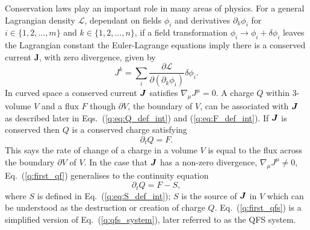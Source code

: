 Conservation laws play an important role in many areas of physics. For a general Lagrangian density $\mathcal{L}$, dependant on fields $\phi_i$ and derivatives $\partial_k \phi_i$ for $i \in \{1,2,...,m \}$ and $k \in \{1,2,...,n \}$, if a field transformation $\phi_i \rightarrow \phi_i + \delta \phi_i$ leaves the Lagrangian constant the Euler-Lagrange equations imply there is a conserved current $\boldsymbol{J}$, with zero divergence, given by
\begin{equation}
J^k = \sum_i \frac{\partial \mathcal{L}}{\partial (\partial_k \phi_i)}\delta \phi_i.
\end{equation}
In curved space a conserved current $\boldsymbol{J}$ satisfies $\nabla_\mu J^\mu = 0$. A charge $Q$ within 3-volume $V$ and a flux $F$ though $\partial V$, the boundary of $V$, can be associated with $\boldsymbol{J}$ as described later in Eqs.~(\ref{q:eq:Q_def_int}) and (\ref{q:eq:F_def_int}). If $\boldsymbol{J}$ is conserved then $Q$ is a conserved charge satisfying
\begin{equation}
\label{q:first_qf}\partial_t Q = {F}.
\end{equation}
This says the rate of change of a charge in a volume $V$ is equal to the flux across the boundary $\partial V$ of $V$. In the case that $\boldsymbol{J}$ has a non-zero divergence, $\nabla_\mu J^\mu \neq 0$, Eq.~(\ref{q:first_qf}) generalises to the continuity equation
\begin{equation}
\label{q:first_qfs}\partial_t {Q} = {F} - {S},
\end{equation}
where $S$ is defined in Eq.~(\ref{q:eq:S_def_int}); ${S}$ is the source of $\boldsymbol{J}$ in $V$ which can be understood as the destruction or creation of charge $Q$. Eq.~(\ref{q:first_qfs}) is a simplified version of Eq.~(\ref{q:qfs_system}), later referred to as the QFS system.



